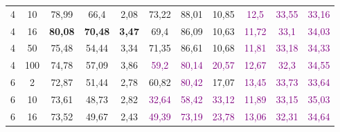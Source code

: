 \begin{table}[ht]
\begin{tabular}{cc|ccc|ccc|ccc}
        {4}                           & {10}   & {78,99}                             & {66,4}                              & {2,08}                                   & {73,22}                   & {88,01}                   & {10,85}                   & \textcolor{purple}{12,5}  & \textcolor{purple}{33,55} & \textcolor{purple}{33,16} \\
        {4}                           & {16}   & {\textbf{80,08}}                    & {\textbf{70,48}}                    & {\textbf{3,47}}                          & {69,4}                    & {86,09}                   & {10,63}                   & \textcolor{purple}{11,72} & \textcolor{purple}{33,1}  & \textcolor{purple}{34,03} \\
        {4}                           & {50}   & {75,48}                             & {54,44}                             & {3,34}                                   & {71,35}                   & {86,61}                   & {10,68}                   & \textcolor{purple}{11,81} & \textcolor{purple}{33,18} & \textcolor{purple}{34,33} \\
        {4}                           & {100}  & {74,78}                             & {57,09}                             & {3,86}                                   & \textcolor{purple}{59,2}  & \textcolor{purple}{80,14} & \textcolor{purple}{20,57} & \textcolor{purple}{12,67} & \textcolor{purple}{32,3}  & \textcolor{purple}{34,55} \\
        {6}                           & {2}    & {72,87}                             & {51,44}                             & {2,78}                                   & {60,82}                   & \textcolor{purple}{80,42} & {17,07}                   & \textcolor{purple}{13,45} & \textcolor{purple}{33,73} & \textcolor{purple}{33,64} \\
        {6}                           & {10}   & {73,61}                             & {48,73}                             & {2,82}                                   & \textcolor{purple}{32,64} & \textcolor{purple}{58,42} & \textcolor{purple}{33,12} & \textcolor{purple}{11,89} & \textcolor{purple}{33,15} & \textcolor{purple}{35,03} \\
        {6}                           & {16}   & {73,52}                             & {49,67}                             & {2,43}                                   & \textcolor{purple}{49,39} & \textcolor{purple}{73,19} & \textcolor{purple}{23,78} & \textcolor{purple}{13,06} & \textcolor{purple}{32,31} & \textcolor{purple}{34,64} \\

\end{tabular}
\end{table}
